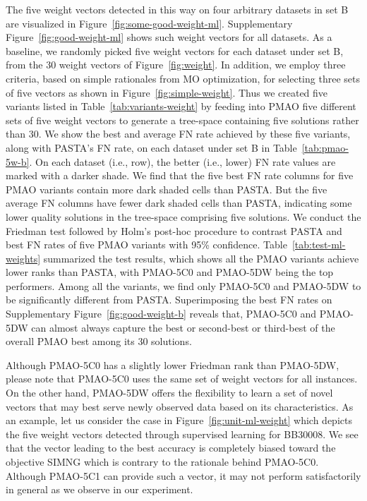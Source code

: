 \documentclass[a4paper,fleqn, review]{cas-dc}
\begin{document}
The five weight vectors detected in this way on four arbitrary datasets in set B are visualized in Figure~\ref{fig:some-good-weight-ml}. Supplementary Figure~\ref{fig:good-weight-ml} shows such weight vectors for all datasets. As a baseline, we randomly picked five weight vectors for each dataset under set B, from the 30 weight vectors of Figure~\ref{fig:weight}. In addition, we employ three criteria, based on simple rationales from MO optimization, for selecting three sets of five vectors as shown in Figure~\ref{fig:simple-weight}.
Thus we created five variants listed in Table~\ref{tab:variants-weight} by feeding into PMAO five different sets of five weight vectors to generate a tree-space containing five solutions rather than 30. We show the best and average FN rate achieved by these five variants, along with PASTA's FN rate, on each dataset under set B in Table~\ref{tab:pmao-5w-b}. On each dataset (i.e., row), the better (i.e., lower) FN rate values are marked with a darker shade. We find that the five best FN rate columns for five PMAO variants contain more dark shaded cells than PASTA. But the five average FN columns have fewer dark shaded cells than PASTA, indicating some lower quality solutions in the tree-space comprising five solutions. We conduct the Friedman test followed by Holm's post-hoc procedure to contrast PASTA and best FN rates of five PMAO variants with 95\% confidence. Table~\ref{tab:test-ml-weights} summarized the test results, which shows all the PMAO variants achieve lower ranks than PASTA, with PMAO-5C0 and PMAO-5DW being the top performers. Among all the variants, we find only PMAO-5C0 and PMAO-5DW to be significantly different from PASTA. Superimposing the best FN rates on Supplementary Figure~\ref{fig:good-weight-b} reveals that, PMAO-5C0 and PMAO-5DW can almost always capture the best or second-best or third-best of the overall PMAO best among its 30 solutions. 

Although PMAO-5C0 has a slightly lower Friedman rank than PMAO-5DW, please note that PMAO-5C0 uses the same set of weight vectors for all instances. On the other hand, PMAO-5DW offers the flexibility to learn a set of novel vectors that may best serve newly observed data based on its characteristics. As an example, let us consider the case in Figure~\ref{fig:unit-ml-weight} which depicts the five weight vectors detected through supervised learning for BB30008. We see that the vector leading to the best accuracy is completely biased toward the objective SIMNG which is contrary to the rationale behind PMAO-5C0. Although PMAO-5C1 can provide such a vector, it may not perform satisfactorily in general as we observe in our experiment.
\end{document}
